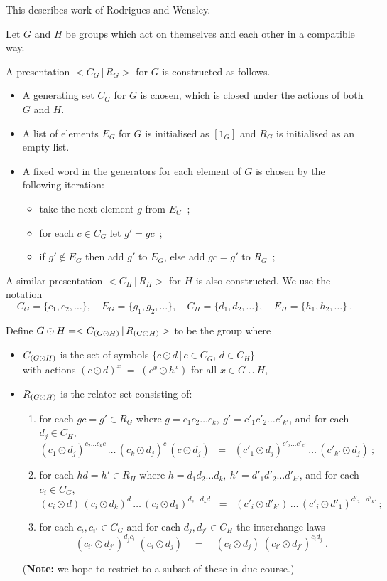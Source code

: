 This describes work of Rodrigues and Wensley.

\vspace{2mm}\noindent
Let  $G$  and  $H$  be groups which act on themselves and each other
in a compatible way.

\vspace{2mm}
\noindent
A presentation  $<C_G \,|\, R_G>$  for  $G$  is constructed as follows.
\begin{itemize}
\item
A generating set  $C_G$  for  $G$  is chosen, which is closed 
under the actions of both  $G$  and  $H$.
\item
A list of elements  $E_G$  for  $G$  is initialised
as  $[1_G]$  and  $R_G$  is initialised as an empty list.
\item
A fixed word in the generators for each element of  $G$
is chosen by the following iteration:
\begin{itemize}
 \item
 take the next element  $g$  from  $E_G$~;
 \item
 for each  $c \in C_G$  let  $g' = gc$~;
 \item
 if  $g' \notin E_G$  then add  $g'$  to  $E_G$,
 else add  $gc = g'$  to  $R_G$~;
\end{itemize}
\end{itemize}

A similar presentation  $<C_H\,|\,R_H>$  for  $H$  is also constructed.
We use the notation 
$$
C_G = \{c_1,c_2,\ldots\}, \quad
E_G = \{g_1,g_2,\ldots\}, \quad
C_H = \{d_1,d_2,\ldots\}, \quad
E_H = \{h_1,h_2,\ldots\}~.
$$

Define  $G \odot H = <C_{(G \odot H)}\,|\,R_{(G \odot H)}>$  
to be the group where 
\begin{itemize}
\item
\quad$C_{(G \odot H)}$  is the set of symbols  
$\{c \odot d \,|\, c \in C_G,\, d \in C_H\}$ \\
with actions  $(c \odot d)^x \;=\; (c^x \odot h^x)$
for all  $x \in G \cup H$,
\item
\quad$R_{(G \odot H)}$  is the relator set consisting of:
\begin{enumerate}[(1)]
\item
for each  $gc = g' \in R_G$  where
$g = c_1c_2 \ldots c_k,~ g' = c'_1c'_2 \ldots c'_{k'}$,
and for each  $d_j \in C_H$,
$$
(c_1 \odot d_j)^{c_2\ldots c_kc}\,\ldots\,
 (c_k \odot d_j)^c\,(c \odot d_j)
\;\;=\;\;
(c'_1 \odot d_j)^{c'_2\ldots c'_{k'}}\,\ldots\,(c'_{k'} \odot d_j)~;
$$
\item
for each  $hd = h' \in R_H$  where
$h = d_1d_2 \ldots d_k,~ h' = d'_1d'_2 \ldots d'_{k'}$,
and for each  $c_i \in C_G$,
$$
 (c_i \odot d)\,(c_i \odot d_k)^d\,\ldots\,(c_i \odot d_1)^{d_2\ldots d_kd}
\;\;=\;\;
 (c'_i \odot d'_{k'})\,\ldots\,(c'_i \odot d'_1)^{d'_2\ldots d'_{k'}}~;
$$
\item 
for each  $c_i,c_{i'} \in C_G$  and for each  $d_j,d_{j'} \in C_H$  
the interchange laws
$$
(c_{i'} \odot d_{j'})^{d_j c_i}\;(c_i \odot d_j)
\quad=\quad 
(c_i \odot d_j)\;(c_{i'} \odot d_{j'})^{c_i d_j}~.
$$
\noindent
\end{enumerate}
(\textbf{Note:} we hope to restrict to a subset of these in due course.)
\end{itemize}

